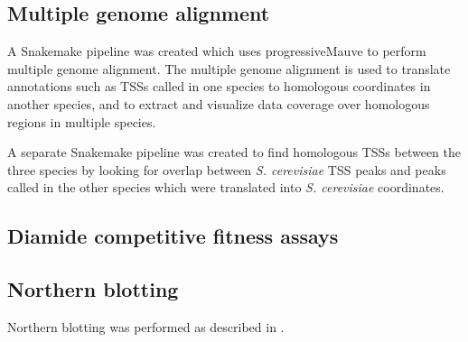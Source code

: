 \subsection{Multiple genome alignment}

A Snakemake pipeline was created which uses progressiveMauve \citep{darling2010} to perform multiple genome alignment.
The multiple genome alignment is used to translate annotations such as TSSs called in one species to homologous coordinates in another species, and to extract and visualize data coverage over homologous regions in multiple species.

A separate Snakemake pipeline was created to find homologous TSSs between the three species by looking for overlap between \textit{S. cerevisiae} TSS peaks and peaks called in the other species which were translated into \textit{S. cerevisiae} coordinates.

\subsection{Diamide competitive fitness assays}

\lipsum[1]

\subsection{Northern blotting}

Northern blotting was performed as described in \citet{degennaro2013}.

\newpage

\begingroup
\singlespacing

\endgroup
